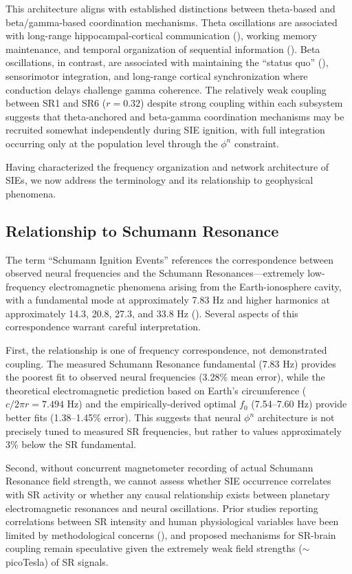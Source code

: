 \documentclass[11pt,a4paper]{article}
\begin{document}
This architecture aligns with established distinctions between theta-based and beta/gamma-based coordination mechanisms. Theta oscillations are associated with long-range hippocampal-cortical communication (\cite{hyman2005medial, colgin2009frequency}), working memory maintenance, and temporal organization of sequential information (\cite{sauseng2009brain}). Beta oscillations, in contrast, are associated with maintaining the ``status quo'' (\cite{engel2010beta, spitzer2017beyond}), sensorimotor integration, and long-range cortical synchronization where conduction delays challenge gamma coherence. The relatively weak coupling between SR1 and SR6 ($r = 0.32$) despite strong coupling within each subsystem suggests that theta-anchored and beta-gamma coordination mechanisms may be recruited somewhat independently during SIE ignition, with full integration occurring only at the population level through the $\phi^n$ constraint.

Having characterized the frequency organization and network architecture of SIEs, we now address the terminology and its relationship to geophysical phenomena.

\subsection{Relationship to Schumann Resonance}

The term ``Schumann Ignition Events'' references the correspondence between observed neural frequencies and the Schumann Resonances—extremely low-frequency electromagnetic phenomena arising from the Earth-ionosphere cavity, with a fundamental mode at approximately 7.83 Hz and higher harmonics at approximately 14.3, 20.8, 27.3, and 33.8 Hz (\cite{nickolaenko2014schumann}). Several aspects of this correspondence warrant careful interpretation.

First, the relationship is one of frequency correspondence, not demonstrated coupling. The measured Schumann Resonance fundamental (7.83 Hz) provides the poorest fit to observed neural frequencies (3.28\% mean error), while the theoretical electromagnetic prediction based on Earth's circumference ($c/2\pi r = 7.494$ Hz) and the empirically-derived optimal $f_0$ (7.54–7.60 Hz) provide better fits (1.38–1.45\% error). This suggests that neural $\phi^n$ architecture is not precisely tuned to measured SR frequencies, but rather to values approximately 3\% below the SR fundamental.

Second, without concurrent magnetometer recording of actual Schumann Resonance field strength, we cannot assess whether SIE occurrence correlates with SR activity or whether any causal relationship exists between planetary electromagnetic resonances and neural oscillations. Prior studies reporting correlations between SR intensity and human physiological variables have been limited by methodological concerns (\cite{cherry2002schumann, saroka2016similar, price2016schumann}), and proposed mechanisms for SR-brain coupling remain speculative given the extremely weak field strengths ($\sim$picoTesla) of SR signals.
\end{document}
